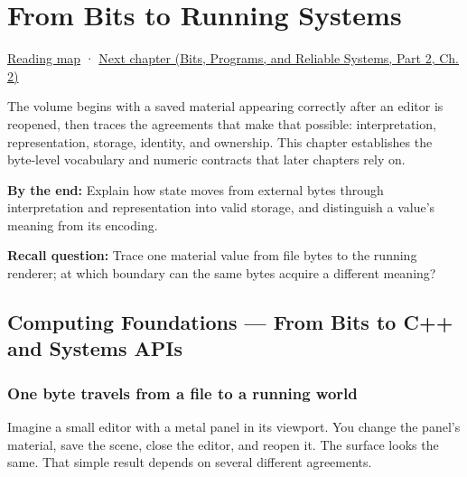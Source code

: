 \chapter{From Bits to Running Systems}\label{01-foundations-i-ch001-from-bits-to-running-systems}\hypertarget{01-foundations-i-ch001}{}\label{stagechapter:01-foundations-i-ch001}

\hypertarget{01-foundations-i-ch001-from-bits-to-running-systems}{}

\hyperref[volume-reading-map]{Reading map} · \href{../01-Bits-Programs-and-Reliable-Systems-P02/main.pdf\#nameddest=01-foundations-i-ch002-values-at-addresses-layout-lifetimes-and-representation}{Next chapter (Bits, Programs, and Reliable Systems, Part 2, Ch. 2)}

The volume begins with a saved material appearing correctly after an editor is reopened, then traces the agreements that make that possible: interpretation, representation, storage, identity, and ownership. This chapter establishes the byte-level vocabulary and numeric contracts that later chapters rely on.

\textbf{By the end:} Explain how state moves from external bytes through interpretation and representation into valid storage, and distinguish a value's meaning from its encoding.

\textbf{Recall question:} Trace one material value from file bytes to the running renderer; at which boundary can the same bytes acquire a different meaning?

\section{Computing Foundations --- From Bits to C++ and Systems APIs}\label{01-foundations-i-ch001-computing-foundations-from-bits-to-c-and-systems-apis}

\hypertarget{01-foundations-i-ch001-computing-foundations-from-bits-to-c-and-systems-apis}{}

\subsection{One byte travels from a file to a running world}\label{01-foundations-i-ch001-one-byte-travels-from-a-file-to-a-running-world}

\hypertarget{01-foundations-i-ch001-one-byte-travels-from-a-file-to-a-running-world}{}

Imagine a small editor with a metal panel in its viewport. You change the panel's material, save the scene, close the editor, and reopen it. The surface looks the same. That simple result depends on several different agreements.

